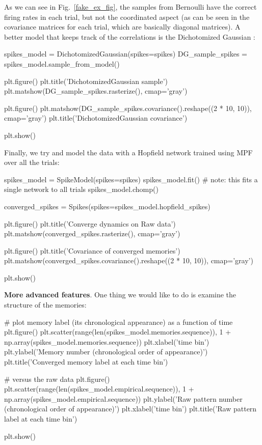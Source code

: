 \documentclass[letter, 12pt]{article}
\theoremstyle{definition}
\theoremstyle{remark}
\begin{document}
As we can see in Fig.~\ref{fake_ex_fig}, the samples from Bernoulli have the correct firing rates in each trial, but not the coordinated aspect (as can be seen in the covariance matrices for each trial, which are basically diagonal matrices).   A better model that keeps track of the correlations is the Dichotomized Gaussian \cite{bethge2008}: \\

\begin{python}
spikes_model = DichotomizedGaussian(spikes=spikes)
DG_sample_spikes = spikes_model.sample_from_model()

plt.figure()
plt.title('DichotomizedGaussian sample')
plt.matshow(DG_sample_spikes.rasterize(), cmap='gray')

plt.figure()
plt.matshow(DG_sample_spikes.covariance().reshape((2 * 10, 10)), cmap='gray')
plt.title('DichotomizedGaussian covariance')

plt.show()
\end{python}

Finally, we try and model the data with a Hopfield network trained using MPF \cite{HS-DK201} over all the trials:

\begin{python}
spikes_model = SpikeModel(spikes=spikes)
spikes_model.fit()  # note: this fits a single network to all trials
spikes_model.chomp()

converged_spikes = Spikes(spikes=spikes_model.hopfield_spikes)

plt.figure()
plt.title('Converge dynamics on Raw data')
plt.matshow(converged_spikes.rasterize(), cmap='gray')

plt.figure()
plt.title('Covariance of converged memories')
plt.matshow(converged_spikes.covariance().reshape((2 * 10, 10)), cmap='gray')

plt.show()
\end{python}

\textbf{More advanced features}.  One thing we would like to do is examine the structure of the memories:

\begin{python}
# plot memory label (its chronological appearance) as a function of time
plt.figure()
plt.scatter(range(len(spikes_model.memories.sequence)),
		1 + np.array(spikes_model.memories.sequence))
plt.xlabel('time bin')
plt.ylabel('Memory number (chronological order of appearance)')
plt.title('Converged memory label at each time bin')

# versus the raw data
plt.figure()
plt.scatter(range(len(spikes_model.empirical.sequence)),
		1 + np.array(spikes_model.empirical.sequence))
plt.ylabel('Raw pattern number (chronological order of appearance)')
plt.xlabel('time bin')
plt.title('Raw pattern label at each time bin')

plt.show()
\end{python}
 
\end{document}
